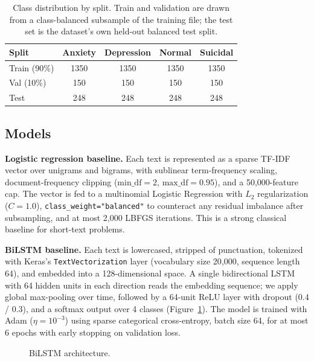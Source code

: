 \documentclass[12pt]{article}
\begin{document}
\begin{table}[h]
\centering
\caption{Class distribution by split. Train and validation are drawn from a class-balanced subsample of the training file; the test set is the dataset's own held-out balanced test split.}
\label{tab:splits}
\begin{tabular}{lcccc}
\toprule
Split & Anxiety & Depression & Normal & Suicidal \\
\midrule
Train (90\%) & 1350 & 1350 & 1350 & 1350 \\
Val (10\%)   & 150  & 150  & 150  & 150  \\
Test         & 248  & 248  & 248  & 248  \\
\bottomrule
\end{tabular}
\end{table}

\subsection{Models}

\textbf{Logistic regression baseline.} Each text is represented as a
sparse TF-IDF vector over unigrams and bigrams, with sublinear
term-frequency scaling, document-frequency clipping
($\text{min\_df}=2$, $\text{max\_df}=0.95$), and a 50{,}000-feature cap.
The vector is fed to a multinomial Logistic Regression with $L_2$
regularization ($C=1.0$), \texttt{class\_weight="balanced"} to
counteract any residual imbalance after subsampling, and at most
2{,}000 LBFGS iterations. This is a strong classical baseline for
short-text problems.

\textbf{BiLSTM baseline.} Each text is lowercased, stripped of
punctuation, tokenized with Keras's \texttt{TextVectorization} layer
(vocabulary size 20{,}000, sequence length 64), and embedded into a
128-dimensional space. A single bidirectional LSTM with 64 hidden
units in each direction reads the embedding sequence; we apply
global max-pooling over time, followed by a 64-unit ReLU layer with
dropout (0.4 / 0.3), and a softmax output over 4 classes
(Figure~\ref{fig:bilstm-arch}). The model is trained with Adam
($\eta=10^{-3}$) using sparse categorical cross-entropy, batch size 64,
for at most 6 epochs with early stopping on validation loss.

\begin{figure}[h]
\centering
{}
\caption{BiLSTM architecture.}
\label{fig:bilstm-arch}
\end{figure}
\end{document}
